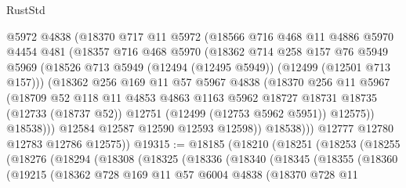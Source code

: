 \begin{lexlean}{RustStd}
\begin{coremodule}
              @5972
              @4838
              (@18370
                @717
                @11
                @5972
                (@18566
                  @716
                  @468
                  @11
                  @4886
                  @5970
                  @4454
                  @481
                  (@18357
                    @716
                    @468
                    @5970
                    (@18362
                      @714
                      @258
                      @157
                      @76
                      @5949
                      @5969
                      (@18526 @713 @5949 (@12494 (@12495 @5949)) (@12499 (@12501 @713 @157)))
                      (@18362
                        @256
                        @169
                        @11
                        @57
                        @5967
                        @4838
                        (@18370
                          @256
                          @11
                          @5967
                          (@18709
                            @52
                            @118
                            @11
                            @4853
                            @4863
                            @1163
                            @5962
                            @18727
                            @18731
                            @18735
                            (@12733 (@18737 @52))
                            @12751
                            (@12499 (@12753 @5962 @5951))
                            @12575))
                        @18538)))
                  @12584
                  @12587
                  @12590
                  @12593
                  @12598))
              @18538)))
        @12777
        @12780
        @12783
        @12786
        @12575))
@19315 := @18185
    (@18210
      (@18251
        (@18253
          (@18255
            (@18276
              (@18294
                (@18308
                  (@18325
                    (@18336
                      (@18340
                        (@18345
                          (@18355
                            (@18360
                              (@19215
                                (@18362
                                  @728
                                  @169
                                  @11
                                  @57
                                  @6004
                                  @4838
                                  (@18370
                                    @728
                                    @11

\end{coremodule}
\end{lexlean}
